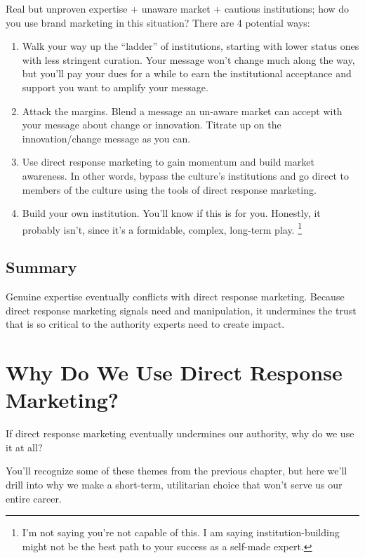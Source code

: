 \documentclass[13pt,]{tufte-handout}
\providecommand{\tightlist}{%
  \setlength{\itemsep}{0pt}\setlength{\parskip}{0pt}}
\begin{document}
Real but unproven expertise + unaware market + cautious institutions;
how do you use brand marketing in this situation? There are 4 potential
ways:

\begin{enumerate}
\def\labelenumi{\arabic{enumi}.}
\tightlist
\item
  Walk your way up the ``ladder'' of institutions, starting with lower
  status ones with less stringent curation. Your message won't change
  much along the way, but you'll pay your dues for a while to earn the
  institutional acceptance and support you want to amplify your message.
\item
  Attack the margins. Blend a message an un-aware market can accept with
  your message about change or innovation. Titrate up on the
  innovation/change message as you can.
\item
  Use direct response marketing to gain momentum and build market
  awareness. In other words, bypass the culture's institutions and go
  direct to members of the culture using the tools of direct response
  marketing.
\item
  Build your own institution. You'll know if this is for you. Honestly,
  it probably isn't, since it's a formidable, complex, long-term play.
  \footnote{I'm not saying you're not capable of this. I am saying
    institution-building might not be the best path to your success as a
    self-made expert.}
\end{enumerate}

\hypertarget{summary-2}{%
\subsection{Summary}\label{summary-2}}

Genuine expertise eventually conflicts with direct response marketing.
Because direct response marketing signals need and manipulation, it
undermines the trust that is so critical to the authority experts need
to create impact.

\hypertarget{why-do-we-use-direct-response-marketing}{%
\section{Why Do We Use Direct Response
Marketing?}\label{why-do-we-use-direct-response-marketing}}

If direct response marketing eventually undermines our authority, why do
we use it at all?

You'll recognize some of these themes from the previous chapter, but
here we'll drill into why we make a short-term, utilitarian choice that
won't serve us our entire career.
\end{document}
